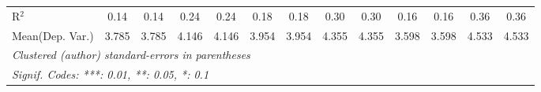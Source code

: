 \begin{tabular}{lcccccccccccc}
   R$^2$                                    & 0.14          & 0.14           & 0.24         & 0.24           & 0.18          & 0.18           & 0.30    & 0.30          & 0.16          & 0.16           & 0.36          & 0.36\\  
Mean(Dep. Var.) & 3.785 & 3.785 & 4.146 & 4.146 & 3.954 & 3.954 & 4.355 & 4.355 & 3.598 & 3.598 & 4.533 & 4.533 \\
   \midrule \midrule
   \multicolumn{13}{l}{\emph{Clustered (author) standard-errors in parentheses}}\\
   \multicolumn{13}{l}{\emph{Signif. Codes: ***: 0.01, **: 0.05, *: 0.1}}\\
\end{tabular}
\par\endgroup
